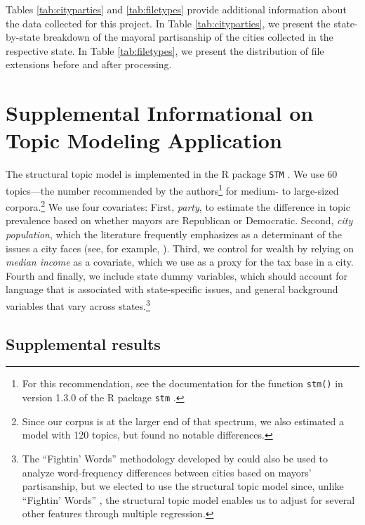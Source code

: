 \documentclass[11pt]{article}
\begin{document}
Tables \ref{tab:cityparties} and \ref{tab:filetypes} provide additional information about the data collected for this project. In Table \ref{tab:cityparties}, we present the state-by-state breakdown of the mayoral partisanship of the cities collected in the respective state. In Table \ref{tab:filetypes}, we present the distribution of file extensions before and after processing. 








\section{Supplemental Informational on Topic Modeling Application}

The structural topic model is implemented in the R package \texttt{STM} \citep{stm}. We use 60 topics---the number recommended by the authors\footnote{For this recommendation, see the documentation for the function \texttt{stm()} in version 1.3.0 of the R package \texttt{stm} \citep{stm}.} for medium- to large-sized corpora.\footnote{Since our corpus is at the larger end of that spectrum, we also estimated a model with 120 topics, but found no notable differences.} We use four covariates: First, \textit{party}, to estimate the difference in topic prevalence based on whether mayors are Republican or Democratic. Second, \textit{city population}, which the literature frequently emphasizes as a determinant of the issues a city faces (see, for example, \cite{Guillamon2013}). Third, we control for wealth by relying on \textit{median income} as a covariate, which we use as a proxy for the tax base in a city. Fourth and finally, we include state dummy variables, which should account for language that is associated with state-specific issues, and general background variables that vary across states.\footnote{The ``Fightin' Words'' methodology developed by \citet{Monroe2008} could also be used to analyze word-frequency differences between cities based on mayors' partisanship, but we elected to use the structural topic model since, unlike ``Fightin' Words'' , the structural topic model enables us to adjust for several other features through multiple regression.} 

\subsection{Supplemental results}
\end{document}

